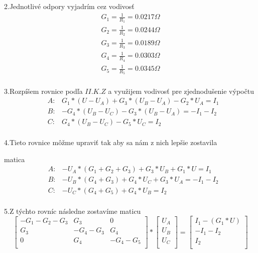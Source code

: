 \documentclass[a4paper,oneside,12pt]{article}
\begin{document}
2.Jednotlivé odpory vyjadrím cez vodivosť
\begin{eqnarray*}
	G_{1} = \frac{1}{R_{1}} = 0.0217 \Omega\\
	G_{2} = \frac{1}{R_{2}} = 0.0244 \Omega\\
	G_{3} = \frac{1}{R_{3}} = 0.0189 \Omega\\
	G_{4} = \frac{1}{R_{4}} = 0.0303 \Omega\\
	G_{5} = \frac{1}{R_{5}} = 0.0345 \Omega\\
\end{eqnarray*}

3.Rozpíšem rovnice podľa $II.K.Z$ a využijem vodivosť pre zjednodušenie výpočtu
\begin{eqnarray*}
	&A: & G_{1} * (U - U_{A}) + G_{3} * (U_{B} - U_{A}) - G_{2} * U_{A} = I_{1}\\
	&B: & -G_{4} * (U_{B} - U_{C}) - G_{3} * (U_{B} - U_{A}) = -I_{1} - I_{2}\\
	&C: & G_{4} * (U_{B} - U_{C}) - G_{5} * U_{C} = I_{2}\\
\end{eqnarray*}

4.Tieto rovnice môžme upraviť tak aby sa nám z nich lepšie zostavila 

matica 
\begin{eqnarray*}
	&A: & -U_{A} * (G_{1} + G_{2} + G_{3}) + G_{3} * U_{B} + G_{1} * U = I_{1}\\
	&B: & -U_{B} * (G_{4} + G_{3}) + G_{4} * U_{C} + G_{3} * U_{A}= -I_{1} - I_{2}\\
	&C: & -U_{C} * (G_{4} + G_{5}) + G_{4} * U_{B}  = I_{2}\\
\end{eqnarray*}

5.Z týchto rovníc následne zostavíme maticu
\[
\begin{bmatrix}
    -G_{1} - G_{2} - G_{3} & G_{3} & 0 \\
    G_{3} & -G_{4} - G_{3} & G_{4} \\
   	0 & G_{4} & -G_{4} - G_{5} \\
\end{bmatrix}
*
\begin{bmatrix}
	U_{A} \\
	U_{B} \\
	U_{C} \\
\end{bmatrix}
=
\begin{bmatrix}
	I_{1} - (G_{1} * U) \\
	-I_{1} - I_{2} \\
	I_{2} \\
\end{bmatrix}
\]\\
\end{document}
